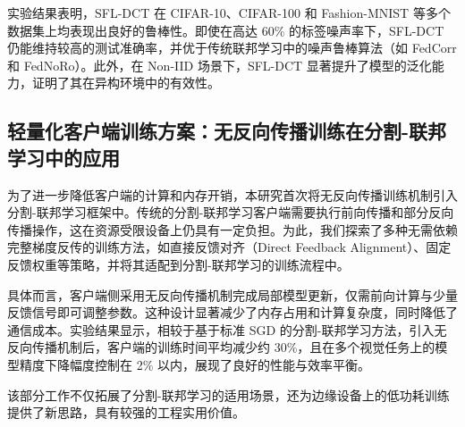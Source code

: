 实验结果表明，SFL-DCT 在 CIFAR-10、CIFAR-100 和 Fashion-MNIST 等多个数据集上均表现出良好的鲁棒性。即使在高达 60\% 的标签噪声率下，SFL-DCT 仍能维持较高的测试准确率，并优于传统联邦学习中的噪声鲁棒算法（如 FedCorr 和 FedNoRo）。此外，在 Non-IID 场景下，SFL-DCT 显著提升了模型的泛化能力，证明了其在异构环境中的有效性。
\subsection{轻量化客户端训练方案：无反向传播训练在分割-联邦学习中的应用}
为了进一步降低客户端的计算和内存开销，本研究首次将无反向传播训练机制引入分割-联邦学习框架中。传统的分割-联邦学习客户端需要执行前向传播和部分反向传播操作，这在资源受限设备上仍具有一定负担。为此，我们探索了多种无需依赖完整梯度反传的训练方法，如直接反馈对齐（Direct Feedback Alignment）、固定反馈权重等策略，并将其适配到分割-联邦学习的训练流程中。

具体而言，客户端侧采用无反向传播机制完成局部模型更新，仅需前向计算与少量反馈信号即可调整参数。这种设计显著减少了内存占用和计算复杂度，同时降低了通信成本。实验结果显示，相较于基于标准 SGD 的分割-联邦学习方法，引入无反向传播机制后，客户端的训练时间平均减少约 30\%，且在多个视觉任务上的模型精度下降幅度控制在 2\% 以内，展现了良好的性能与效率平衡。

该部分工作不仅拓展了分割-联邦学习的适用场景，还为边缘设备上的低功耗训练提供了新思路，具有较强的工程实用价值。
